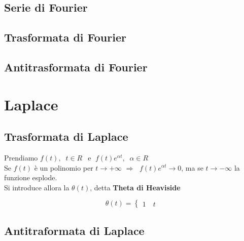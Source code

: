 \documentclass[x11names]{article}
\begin{document}
\subsection{Serie di Fourier}
\subsection{Trasformata di Fourier}
\subsection{Antitrasformata di Fourier}

\section{Laplace}
\subsection{Trasformata di Laplace}
Prendiamo $f(t), \;\; t\in R\;\,$ e $\;f(t)e^{\alpha t},\;\; \alpha \in R$ \\
Se $f(t)$ è un polinomio per $t \to +\infty$ $\Longrightarrow$ $\;f(t)e^{\alpha t} \to 0$, ma se $t \to -\infty$ la funzione esplode.\\Si introduce allora la $\theta(t)$, detta \textbf{Theta di Heaviside}

\[
	\theta(t) = \begin{cases}
		1 \quad t 
	\end{cases}
\]
\subsection{Antitraformata di Laplace}
\end{document}
